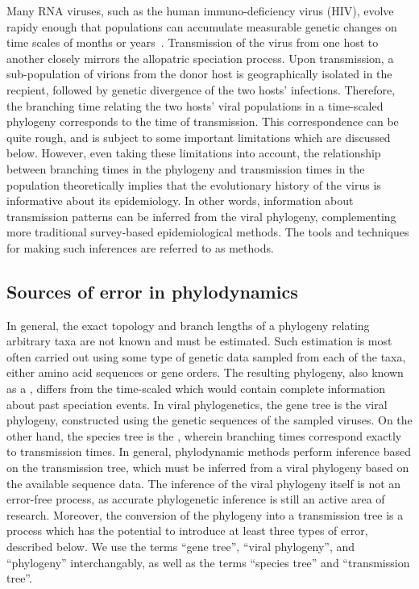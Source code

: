 Many RNA viruses, such as the human immuno-deficiency virus (HIV), evolve
rapidy enough that populations can accumulate measurable genetic changes on
time scales of months or years~\autocite{drummond2003measurably}. Transmission
of the virus from one host to another closely mirrors the allopatric speciation
process. Upon transmission, a sub-population of virions from the donor host is
geographically isolated in the recpient, followed by genetic divergence of the
two hosts' infections. Therefore, the branching time relating the two hosts'
viral populations in a time-scaled phylogeny corresponds to the time of
transmission. This correspondence can be quite rough, and is subject to some
important limitations which are discussed below. However, even taking these
limitations into account, the relationship between branching times in the
phylogeny and transmission times in the population theoretically implies that
the evolutionary history of the virus is informative about its epidemiology. In
other words, information about transmission patterns can be inferred from the
viral phylogeny, complementing more traditional survey-based epidemiological
methods. The tools and techniques for making such inferences are referred to as
 methods.

\subsection{Sources of error in phylodynamics}

In general, the exact topology and branch lengths of a phylogeny relating
arbitrary taxa are not known and must be estimated. Such estimation is most
often carried out using some type of genetic data sampled from each of the
taxa, either amino acid sequences or gene orders. The resulting phylogeny, also
known as a , differs from the time-scaled 
which would contain complete information about past speciation events. In
viral phylogenetics, the gene tree is the viral phylogeny, constructed using
the genetic sequences of the sampled viruses. On the other hand, the species
tree is the , wherein branching times correspond
exactly to transmission times. In general, phylodynamic methods perform
inference based on the transmission tree, which must be inferred from a viral
phylogeny based on the available sequence data. The inference of the viral
phylogeny itself is not an error-free process, as accurate phylogenetic
inference is still an active area of research. Moreover, the conversion of the
phylogeny into a transmission tree is a process which has the potential to
introduce at least three types of error, described below. We use the terms
``gene tree'', ``viral phylogeny'', and ``phylogeny'' interchangably, as well
as the terms ``species tree'' and ``transmission tree''.

